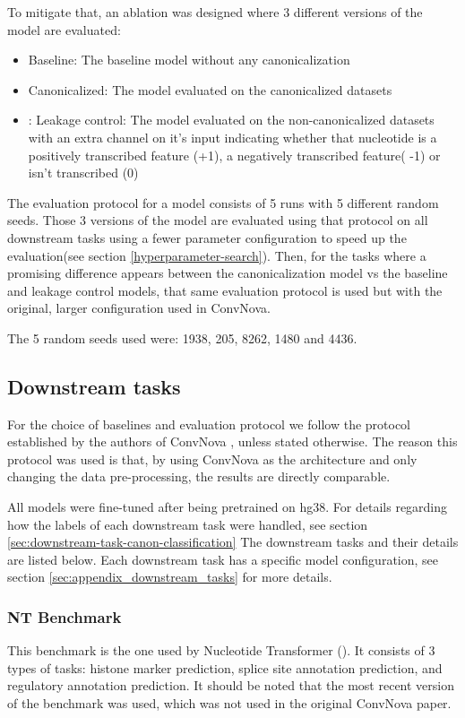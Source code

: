 \documentclass[   ]{article}
\begin{document}
To mitigate that, an ablation was designed where 3 different versions of the model are evaluated:
\begin{itemize}
	\item Baseline: The baseline model without any canonicalization
	\item Canonicalized: The model evaluated on the canonicalized datasets
	\item: Leakage control: The model evaluated on the non-canonicalized datasets with an extra channel on it's input indicating whether that nucleotide is a positively transcribed feature (+1), a negatively transcribed feature( -1) or isn't transcribed (0)
\end{itemize}

The evaluation protocol for a model consists of 5 runs with 5 different random seeds. Those 3 versions of the model are evaluated using that protocol on all downstream tasks using a fewer parameter configuration to speed up the evaluation(see section \ref{hyperparameter-search}). Then, for the tasks where a promising difference appears between the canonicalization model vs the baseline and leakage control models, that same evaluation protocol is used but with the original, larger configuration used in ConvNova.

The 5 random seeds used were: 1938, 205, 8262, 1480 and 4436.

\subsection{Downstream tasks}
For the choice of baselines and evaluation protocol we
follow the protocol established by the authors of ConvNova
\citep{boRevisitingConvolutionArchitecture2025}, unless stated
otherwise. The reason this protocol was used is that, by using ConvNova
as the architecture and only changing the data pre-processing, the
results are directly comparable.

All models were fine-tuned after being pretrained on hg38. For details
regarding how the labels of each downstream task were handled, see
section \ref{sec:downstream-task-canon-classification} The downstream tasks and their details are listed below. Each downstream task has a specific model configuration, see section \ref{sec:appendix_downstream_tasks} for more details.

\subsubsection{NT Benchmark} 
This benchmark is the one used by Nucleotide Transformer
(\cite{dalla-torreNucleotideTransformerBuilding2025}). It consists of 3
types of tasks: histone marker prediction, splice site annotation
prediction, and regulatory annotation prediction. It should be noted
that the most recent version of the benchmark was used, which was not
used in the original ConvNova paper.
\end{document}
